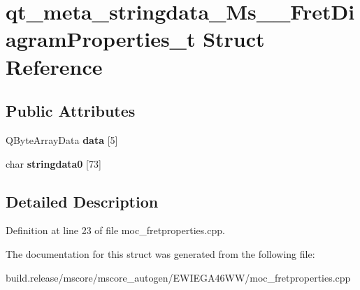 \hypertarget{structqt__meta__stringdata___ms_____fret_diagram_properties__t}{}\section{qt\+\_\+meta\+\_\+stringdata\+\_\+\+Ms\+\_\+\+\_\+\+Fret\+Diagram\+Properties\+\_\+t Struct Reference}
\label{structqt__meta__stringdata___ms_____fret_diagram_properties__t}
\subsection*{Public Attributes}
\begin{DoxyCompactItemize}
\item 
\mbox{\label{structqt__meta__stringdata___ms_____fret_diagram_properties__t_afa3d24c53c5363768ba56af1ec43434e}} 
Q\+Byte\+Array\+Data {\bfseries data} \mbox{[}5\mbox{]}
\item 
\mbox{\label{structqt__meta__stringdata___ms_____fret_diagram_properties__t_ac268683a9b85d2c18c34bed230eae04d}} 
char {\bfseries stringdata0} \mbox{[}73\mbox{]}
\end{DoxyCompactItemize}


\subsection{Detailed Description}


Definition at line 23 of file moc\+\_\+fretproperties.\+cpp.



The documentation for this struct was generated from the following file\+:\begin{DoxyCompactItemize}
\item 
build.\+release/mscore/mscore\+\_\+autogen/\+E\+W\+I\+E\+G\+A46\+W\+W/moc\+\_\+fretproperties.\+cpp\end{DoxyCompactItemize}
